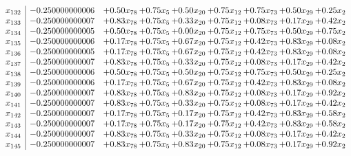 \documentclass[8pt]{article}
\begin{document}
\[\begin{array}{c| c c@{\hskip 2pt} c@{\hskip 2pt} c@{\hskip 2pt} c@{\hskip 2pt} c@{\hskip 2pt} c@{\hskip 2pt} c@{\hskip 2pt} }
 x_{132}   &  -0.250000000006 & +  0.50 x_{78} & +  0.75 x_{5} & +  0.50 x_{20} & +  0.75 x_{12} & +  0.75 x_{73} & +  0.50 x_{29} & +  0.25 x_{2}\\
 x_{133}   &  -0.250000000007 & +  0.83 x_{78} & +  0.75 x_{5} & +  0.33 x_{20} & +  0.75 x_{12} & +  0.08 x_{73} & +  0.17 x_{29} & +  0.42 x_{2}\\
 x_{134}   &  -0.250000000005 & +  0.50 x_{78} & +  0.75 x_{5} & +  0.00 x_{20} & +  0.75 x_{12} & +  0.75 x_{73} & +  0.50 x_{29} & +  0.75 x_{2}\\
 x_{135}   &  -0.250000000006 & +  0.17 x_{78} & +  0.75 x_{5} & +  0.67 x_{20} & +  0.75 x_{12} & +  0.42 x_{73} & +  0.83 x_{29} & +  0.08 x_{2}\\
 x_{136}   &  -0.250000000005 & +  0.17 x_{78} & +  0.75 x_{5} & +  0.67 x_{20} & +  0.75 x_{12} & +  0.42 x_{73} & +  0.83 x_{29} & +  0.08 x_{2}\\
 x_{137}   &  -0.250000000007 & +  0.83 x_{78} & +  0.75 x_{5} & +  0.33 x_{20} & +  0.75 x_{12} & +  0.08 x_{73} & +  0.17 x_{29} & +  0.42 x_{2}\\
 x_{138}   &  -0.250000000006 & +  0.50 x_{78} & +  0.75 x_{5} & +  0.50 x_{20} & +  0.75 x_{12} & +  0.75 x_{73} & +  0.50 x_{29} & +  0.25 x_{2}\\
 x_{139}   &  -0.250000000006 & +  0.17 x_{78} & +  0.75 x_{5} & +  0.67 x_{20} & +  0.75 x_{12} & +  0.42 x_{73} & +  0.83 x_{29} & +  0.08 x_{2}\\
 x_{140}   &  -0.250000000007 & +  0.83 x_{78} & +  0.75 x_{5} & +  0.83 x_{20} & +  0.75 x_{12} & +  0.08 x_{73} & +  0.17 x_{29} & +  0.92 x_{2}\\
 x_{141}   &  -0.250000000007 & +  0.83 x_{78} & +  0.75 x_{5} & +  0.33 x_{20} & +  0.75 x_{12} & +  0.08 x_{73} & +  0.17 x_{29} & +  0.42 x_{2}\\
 x_{142}   &  -0.250000000007 & +  0.17 x_{78} & +  0.75 x_{5} & +  0.17 x_{20} & +  0.75 x_{12} & +  0.42 x_{73} & +  0.83 x_{29} & +  0.58 x_{2}\\
 x_{143}   &  -0.250000000007 & +  0.17 x_{78} & +  0.75 x_{5} & +  0.17 x_{20} & +  0.75 x_{12} & +  0.42 x_{73} & +  0.83 x_{29} & +  0.58 x_{2}\\
 x_{144}   &  -0.250000000007 & +  0.83 x_{78} & +  0.75 x_{5} & +  0.33 x_{20} & +  0.75 x_{12} & +  0.08 x_{73} & +  0.17 x_{29} & +  0.42 x_{2}\\
 x_{145}   &  -0.250000000007 & +  0.83 x_{78} & +  0.75 x_{5} & +  0.83 x_{20} & +  0.75 x_{12} & +  0.08 x_{73} & +  0.17 x_{29} & +  0.92 x_{2}\\

\end{array}\]
\end{document}
